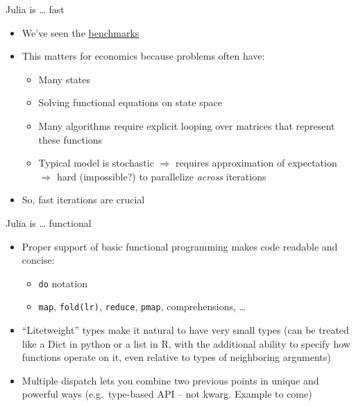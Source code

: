 \documentclass[compress,10pt]{beamer}
\begin{document}
\begin{frame}{Julia is \ldots{} fast}

\begin{itemize}
\itemsep1pt\parskip0pt
\item
  We've seen the \href{http://julialang.org}{benchmarks}
\item
  This matters for economics because problems often have:

  \begin{itemize}
  \itemsep1pt\parskip0pt
  \item
    Many states
  \item
    Solving functional equations on state space
  \item
    Many algorithms require explicit looping over matrices that
    represent these functions
  \item
    Typical model is stochastic \(\Rightarrow\) requires approximation
    of expectation \(\Rightarrow\) hard (impossible?) to parallelize
    \emph{across} iterations
  \end{itemize}
\item
  So, fast iterations are crucial
\end{itemize}

\end{frame}

\begin{frame}{Julia is \ldots{} functional}

\begin{itemize}
\itemsep1pt\parskip0pt
\item
  Proper support of basic functional programming makes code readable and
  concise:

  \begin{itemize}
  \itemsep1pt\parskip0pt
  \item
    \texttt{do} notation
  \item
    \texttt{map}, \texttt{fold(l\textbar{}r)}, \texttt{reduce},
    \texttt{pmap}, comprehensions, \ldots{}
  \end{itemize}
\item
  ``Litetweight'' types make it natural to have very small types (can be
  treated like a Dict in python or a list in R, with the additional
  ability to specify how functions operate on it, even relative to types
  of neighboring arguments)
\item
  Multiple dispatch lets you combine two previous points in unique and
  powerful ways (e.g.~type-based API -- not kwarg. Example to come)
\end{itemize}

\end{frame}
\end{document}
